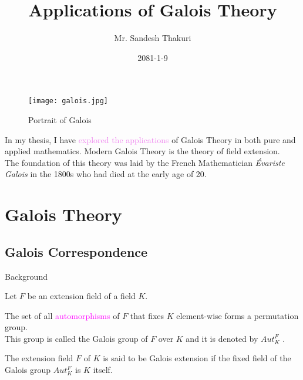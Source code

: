 \documentclass{beamer}
\title{Applications of Galois Theory}
\author[Sandesh Thakuri]{Mr. Sandesh Thakuri}
\institute[CDM, TU]
{Central Department of Mathematics, TU}
\date{2081-1-9}
\begin{document}
\myfootline

\begin{frame}[plain]
  \tikzonlytitlepage
  \titlepage
\end{frame}

\begin{frame}[plain]
\begin{figure}[h!]
  \centering
  \texttt{[image: galois.jpg]}
  \caption{\footnotesize Portrait of Galois}
\end{figure}

In my thesis, I have \textcolor{violet}{explored the applications} of Galois Theory in both pure and applied mathematics. Modern Galois Theory is the theory of field extension. \\
\textcolor{green!50!black}{The foundation of this theory was laid by the French Mathematician \textit{Évariste Galois} in the 1800s who had died at the early age of 20.}
\end{frame}

\begin{frame}[plain]
  \begin{tcolorbox}[colframe=blue!80!violet, colback=white, boxsep=3mm,  title={ \large \bfseries Outlines}]
    \vspace{3mm}
    \tableofcontents
  \end{tcolorbox}
\end{frame}

\small
\section{Galois Theory}

\subsection{Galois Correspondence}
\begin{frame}{Background}

 Let \(F\) be an extension field of a field \(K\).
  \vspace{5mm}

  \begin{tcolorbox}[colframe=blue!40, colback=white, boxsep=1mm]
    \begin{definition} 
      The set of all \textcolor{magenta}{automorphisms} of \(F\) that fixes \(K\) element-wise forms a permutation group.\\[2mm]
      This group is called the Galois group of \(F\) over \(K\) and it is denoted by \(Aut_K^F\) \cite{hunger}.
    \end{definition}
    \vspace{4mm}
    \begin{definition}
      The extension field \(F\) of \(K\) is said to be Galois extension if the fixed field of the Galois group \(Aut_K^F\) is \(K\) itself.
    \end{definition}
  \end{tcolorbox}
\end{frame}
\end{document}
